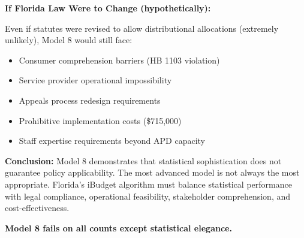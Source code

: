 \textbf{If Florida Law Were to Change (hypothetically):}

Even if statutes were revised to allow distributional allocations (extremely unlikely), Model 8 would still face:
\begin{itemize}
    \item Consumer comprehension barriers (HB 1103 violation)
    \item Service provider operational impossibility
    \item Appeals process redesign requirements
    \item Prohibitive implementation costs (\$715,000)
    \item Staff expertise requirements beyond APD capacity
\end{itemize}

\textbf{Conclusion:} Model 8 demonstrates that statistical sophistication does not guarantee policy applicability. The most advanced model is not always the most appropriate. Florida's iBudget algorithm must balance statistical performance with legal compliance, operational feasibility, stakeholder comprehension, and cost-effectiveness.

\textbf{Model 8 fails on all counts except statistical elegance.}

